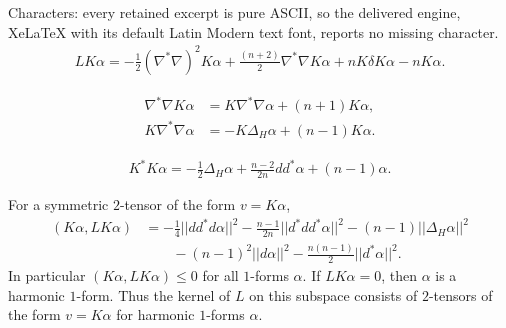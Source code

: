 \documentclass[10pt,a4paper]{amsart}
\begin{document}
Characters: every retained excerpt is pure ASCII, so the delivered engine, XeLaTeX with its default Latin Modern text font, reports no missing character.
\begin{align}
\label{eqn:LKalpha}
L K \alpha = -\frac{1}{2} (\nabla^*\nabla )^2 K \alpha + \frac{(n+2)}{2} \nabla^*\nabla K \alpha + n K \delta K \alpha - n K \alpha.
\end{align}

\begin{align}
\nabla^* \nabla  K \alpha & =  K \nabla^*\nabla \alpha + (n+1) K \alpha,  \nonumber \\
K \nabla^* \nabla \alpha & = -K \Delta_H \alpha + (n-1) K \alpha.
\label{110}
\end{align}

\begin{align}
K^* K \alpha = -\frac12 \Delta_H \alpha + \frac{n-2}{2n} dd^* \alpha + (n-1)\alpha.
\label{111}
\end{align}

\begin{prop} \label{prop:spec-est-imK}
For a symmetric $2$-tensor of the form $v = K \alpha$, 
\begin{align} \label{eqn:spec-est-imK}
(K\alpha, LK\alpha) & = -\frac14 ||dd^*d\alpha||^2 - \frac{n-1}{2n} ||d^* d d^*\alpha||^2 - (n-1) ||\Delta_H \alpha||^2 \nonumber \\
& \qquad - (n-1)^2 ||d\alpha||^2 - \frac{n(n-1)}{2} ||d^*\alpha||^2. 
\end{align}
In particular $ (K \alpha, L K \alpha) \leq 0$ for all $1$-forms $\alpha$.  If $L K \alpha = 0$, then $\alpha$ is a harmonic $1$-form.  Thus the kernel of $L$ on this subspace consists of $2$-tensors of the form $v = K \alpha$ for harmonic $1$-forms $\alpha$.
\end{prop}
\end{document}

